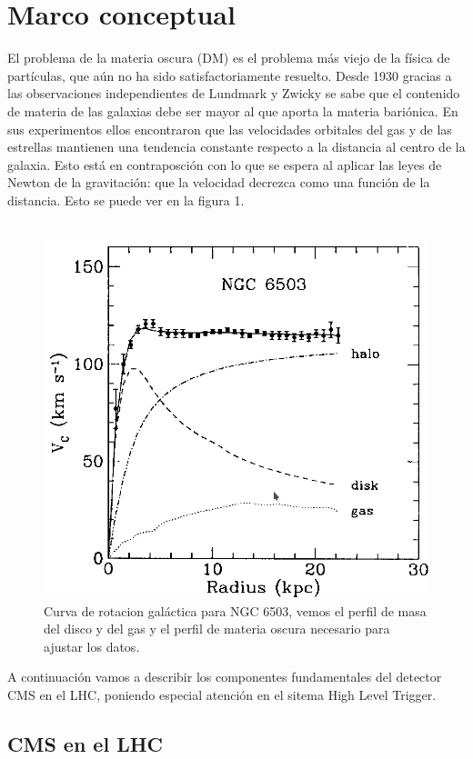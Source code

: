 \section{Marco conceptual}
El problema de la materia oscura (DM) es el problema más viejo de la física de partículas, que aún no ha sido satisfactoriamente resuelto. Desde 1930 gracias a las observaciones independientes de Lundmark y Zwicky \cite{Zwi,Lun} se sabe que el contenido de materia de las galaxias debe ser mayor al que aporta la materia bariónica. En sus experimentos ellos encontraron que las velocidades orbitales del gas y de las estrellas mantienen una tendencia constante respecto a la distancia al centro de la galaxia.
 Esto está en contraposción con lo que se espera al aplicar las leyes de Newton de la gravitación: que la velocidad decrezca como una función de la distancia. Esto se puede ver en la figura 1.
\\
\\
\begin{figure}
\centering
\includegraphics[width=12cm]{F1.png}
\caption{\label{fig:frog} Curva de rotacion galáctica para NGC 6503, vemos el perfil de masa del disco y del gas y el perfil de materia oscura necesario para ajustar los datos.}
\end{figure}
A continuación vamos a describir los componentes fundamentales del detector CMS en el LHC, poniendo especial atención en el sitema High Level Trigger.


\label{sec:examples}

\subsection{CMS en el LHC}

